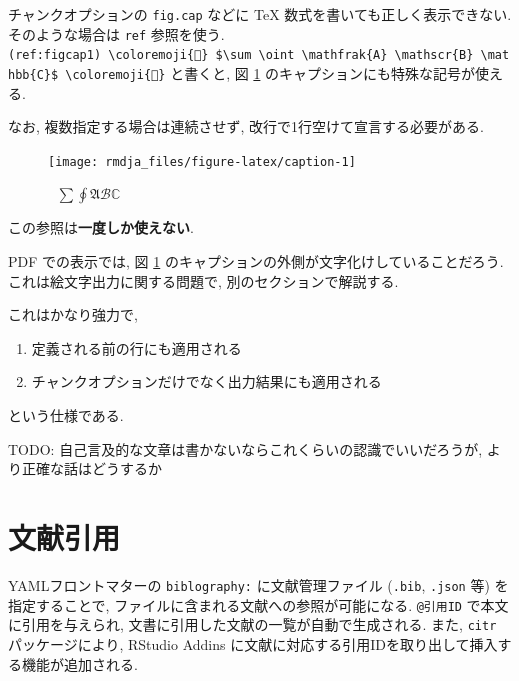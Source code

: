 \documentclass[
]{bxjsbook}
\providecommand{\tightlist}{%
  \setlength{\itemsep}{0pt}\setlength{\parskip}{0pt}}
\theoremstyle{definition}
\theoremstyle{definition}
\theoremstyle{definition}
\theoremstyle{remark}
\begin{document}
チャンクオプションの \texttt{fig.cap} などに TeX
数式を書いても正しく表示できない. そのような場合は \texttt{ref}
参照を使う.
\texttt{(ref:figcap1)\ \textbackslash{}coloremoji\{🌸\}\ \$\textbackslash{}sum\ \textbackslash{}oint\ \textbackslash{}mathfrak\{A\}\ \textbackslash{}mathscr\{B\}\ \textbackslash{}mathbb\{C\}\$\ \textbackslash{}coloremoji\{🌸\}}
と書くと, 図 \ref{fig:caption} のキャプションにも特殊な記号が使える.




なお, 複数指定する場合は連続させず, 改行で1行空けて宣言する必要がある.

\begin{figure}

{\centering \texttt{[image: rmdja\_files/figure-latex/caption-1]} 

}

\caption{🌸
\(\sum \oint \mathfrak{A} \mathscr{B} \mathbb{C}\) 🌸}\label{fig:caption}
\end{figure}

この参照は\textbf{一度しか使えない}.

PDF での表示では, 図 \ref{fig:caption}
のキャプションの外側が文字化けしていることだろう.
これは絵文字出力に関する問題で, 別のセクションで解説する.

これはかなり強力で,

\begin{enumerate}
\def\labelenumi{\arabic{enumi}.}
\tightlist
\item
  定義される前の行にも適用される
\item
  チャンクオプションだけでなく出力結果にも適用される
\end{enumerate}

という仕様である.

TODO: 自己言及的な文章は書かないならこれくらいの認識でいいだろうが,
より正確な話はどうするか

\hypertarget{bibliography}{%
\section{文献引用}\label{bibliography}}

YAMLフロントマターの \texttt{biblography:} に文献管理ファイル
(\texttt{.bib}, \texttt{.json} 等) を指定することで,
ファイルに含まれる文献への参照が可能になる. \texttt{@引用ID}
で本文に引用を与えられ, 文書に引用した文献の一覧が自動で生成される.
また, \texttt{citr} パッケージにより, RStudio Addins
に文献に対応する引用IDを取り出して挿入する機能が追加される.
\end{document}
